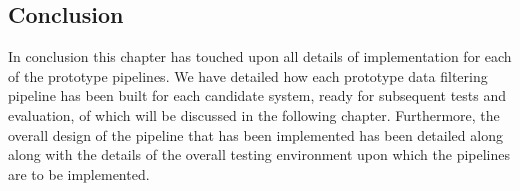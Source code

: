 \subsection{Conclusion} %
\label{sub:implement_conclusion}

In conclusion this chapter has touched upon all details of implementation for each of the prototype pipelines.
We have detailed how each prototype data filtering pipeline has been built for each candidate system, ready
for subsequent tests and evaluation, of which will be discussed in the following chapter. Furthermore, the overall
design of the pipeline that has been implemented has been detailed along along with the details of the overall testing
environment upon which the pipelines are to be implemented.

